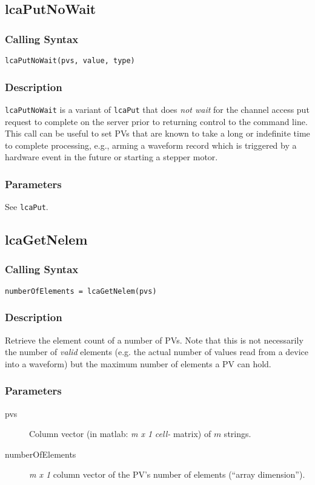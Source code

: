 \documentclass{article}
\newcommand{\com}[1]{{\tt #1}}
\newcommand{\pbrkf}{\pagebreak}
\newcommand{\ita}[1]{\emph{#1}}
\newcommand{\m}{$m$}
\newcommand{\mhack}{$m$} %
\newcommand{\mxl}{$m\times 1$}
\renewcommand{\m}{\ita{m}}
\newcommand{\mhack}{\ita{m}} %
\renewcommand{\mxl}{\ita{m x 1}}
\renewcommand{\pbrkf}{}
\newcommand{\PVITEM}{
\item[pvs] Column vector (in matlab: \mxl{} \ita{cell-} matrix)
of \mhack{} strings.
}
\begin{document}
\subsection{lcaPutNoWait}
\label{lcaputnowait}
\subsubsection{Calling Syntax}
\begin{verbatim}
lcaPutNoWait(pvs, value, type)
\end{verbatim}
\subsubsection{Description}
\com{lcaPutNoWait} is a variant of \com{lcaPut} that does {\em not wait}
for the channel access put request to complete on the server prior to
returning control to the command line.
This call can be useful to set PVs that are known to take a long
or indefinite time to complete processing, e.g., arming a waveform record
which is triggered by a hardware event in the future or starting a stepper
motor.

\subsubsection{Parameters}
See \com{lcaPut}.

\pbrkf
\subsection{lcaGetNelem}
\subsubsection{Calling Syntax}
\begin{verbatim}
numberOfElements = lcaGetNelem(pvs)
\end{verbatim}
\subsubsection{Description}
Retrieve the element count of a number of PVs. Note that this is not
necessarily the number of \ita{valid} elements (e.g. the actual number
of values read from a device into a waveform) but the maximum number
of elements a PV can hold.
\subsubsection{Parameters}
\begin{description}
\PVITEM
\item[numberOfElements] \mxl{} column vector of the PV's number
of elements (``array dimension'').
\end{description}
\end{document}

